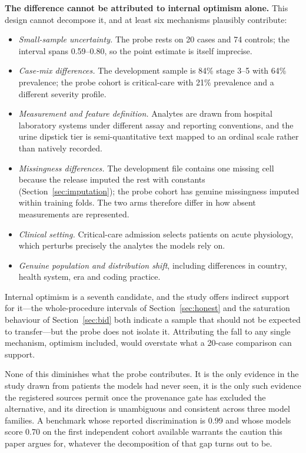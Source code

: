 \documentclass[conference]{IEEEtran}
\begin{document}
\textbf{The difference cannot be attributed to internal optimism alone.}
This design cannot decompose it, and at least six mechanisms plausibly
contribute:

\begin{itemize}
  \item \emph{Small-sample uncertainty.} The probe rests on 20 cases and 74
        controls; the interval spans 0.59--0.80, so the point estimate is
        itself imprecise.
  \item \emph{Case-mix differences.} The development sample is 84\% stage
        3--5 with 64\% prevalence; the probe cohort is critical-care with
        21\% prevalence and a different severity profile.
  \item \emph{Measurement and feature definition.} Analytes are drawn from
        hospital laboratory systems under different assay and reporting
        conventions, and the urine dipstick tier is semi-quantitative text
        mapped to an ordinal scale rather than natively recorded.
  \item \emph{Missingness differences.} The development file contains one
        missing cell because the release imputed the rest with constants
        (Section~\ref{sec:imputation}); the probe cohort has genuine
        missingness imputed within training folds. The two arms therefore
        differ in how absent measurements are represented.
  \item \emph{Clinical setting.} Critical-care admission selects patients on
        acute physiology, which perturbs precisely the analytes the models
        rely on.
  \item \emph{Genuine population and distribution shift}, including
        differences in country, health system, era and coding practice.
\end{itemize}

Internal optimism is a seventh candidate, and the study offers indirect
support for it---the whole-procedure intervals of Section~\ref{sec:honest} and the
saturation behaviour of Section~\ref{sec:bid} both indicate a sample that
should not be expected to transfer---but the probe does not isolate it.
Attributing the fall to any single mechanism, optimism included, would
overstate what a 20-case comparison can support.

None of this diminishes what the probe contributes. It is the only evidence
in the study drawn from patients the models had never seen, it is the only
such evidence the registered sources permit once the provenance gate has
excluded the alternative, and its direction is unambiguous and consistent
across three model families. A benchmark whose reported discrimination is
0.99 and whose models score 0.70 on the first independent cohort available
warrants the caution this paper argues for, whatever the decomposition of
that gap turns out to be.
\end{document}
